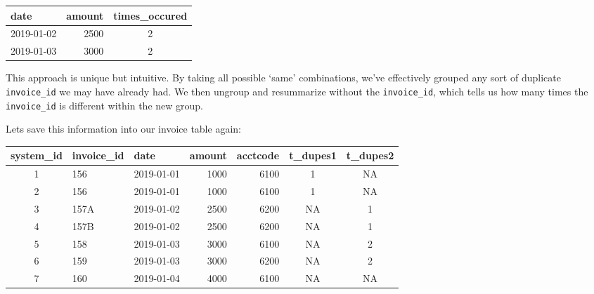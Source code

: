 \documentclass[
]{book}
\newenvironment{Shaded}{\begin{snugshade}}{\end{snugshade}}
\newcommand{\DataTypeTok}[1]{\textcolor[rgb]{0.13,0.29,0.53}{#1}}
\newcommand{\KeywordTok}[1]{\textcolor[rgb]{0.13,0.29,0.53}{\textbf{#1}}}
\newcommand{\NormalTok}[1]{#1}
\newcommand{\OperatorTok}[1]{\textcolor[rgb]{0.81,0.36,0.00}{\textbf{#1}}}
\newcommand{\StringTok}[1]{\textcolor[rgb]{0.31,0.60,0.02}{#1}}
\begin{document}
\captionsetup[table]{labelformat=empty,skip=1pt}
\begin{longtable}{lrc}
\toprule
date & amount & times\_occured \\ 
\midrule
2019-01-02 & 2500 & 2 \\ 
2019-01-03 & 3000 & 2 \\ 
\bottomrule
\end{longtable}

This approach is unique but intuitive. By taking all possible `same' combinations, we've effectively grouped any sort of duplicate \texttt{invoice\_id} we may have already had. We then ungroup and resummarize without the \texttt{invoice\_id}, which tells us how many times the \texttt{invoice\_id} is different within the new group.

Lets save this information into our invoice table again:

\begin{Shaded}
\end{Shaded}

\captionsetup[table]{labelformat=empty,skip=1pt}
\begin{longtable}{cllrrcc}
\toprule
system\_id & invoice\_id & date & amount & acctcode & t\_dupes1 & t\_dupes2 \\ 
\midrule
1 & 156 & 2019-01-01 & 1000 & 6100 & 1 & NA \\ 
2 & 156 & 2019-01-01 & 1000 & 6100 & 1 & NA \\ 
3 & 157A & 2019-01-02 & 2500 & 6200 & NA & 1 \\ 
4 & 157B & 2019-01-02 & 2500 & 6200 & NA & 1 \\ 
5 & 158 & 2019-01-03 & 3000 & 6100 & NA & 2 \\ 
6 & 159 & 2019-01-03 & 3000 & 6200 & NA & 2 \\ 
7 & 160 & 2019-01-04 & 4000 & 6100 & NA & NA \\ 
\bottomrule
\end{longtable}
\end{document}
